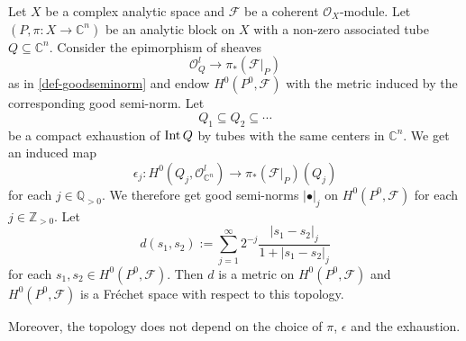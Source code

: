 \begin{lemma}
    Let $X$ be a complex analytic space and $\mathcal{F}$ be a coherent $\mathcal{O}_X$-module.
Let $(P,\pi:X\rightarrow \mathbb{C}^n)$ be an analytic block on $X$ with a non-zero associated tube $Q\subseteq \mathbb{C}^n$. Consider the epimorphism of sheaves 
\[
    \mathcal{O}_Q^l\rightarrow \pi_*(\mathcal{F}|_P)
\]
as in \cref{def-goodseminorm} and endow $H^0(P^0,\mathcal{F})$ with the metric induced by the corresponding good semi-norm. Let 
\[
    Q_1\subseteq Q_2\subseteq \cdots
\]
be a compact exhaustion of $\operatorname{Int} Q$ by tubes with the same centers in $\mathbb{C}^n$. We get an induced map
\[
    \epsilon_j:H^0(Q_j,\mathcal{O}_{\mathbb{C}^n}^l) \rightarrow \pi_*(\mathcal{F}|_P)(Q_j) 
\]
for each $j\in \mathbb{Q}_{>0}$. We therefore get good semi-norms $|\bullet|_j$ on $H^0(P^0, \mathcal{F})$ for each $j\in \mathbb{Z}_{>0}$. Let
\[
    d(s_1,s_2):=\sum_{j=1}^{\infty}  2^{-j}\frac{|s_1-s_2|_j}{1+|s_1-s_2|_j}
\]
for each $s_1,s_2\in H^0(P^0, \mathcal{F})$. Then $d$ is a metric on  $H^0(P^0, \mathcal{F})$ and $H^0(P^0, \mathcal{F})$ is a Fréchet space with respect to this topology.

Moreover, the topology does not depend on the choice of $\pi$, $\epsilon$ and the exhaustion.
\end{lemma}
